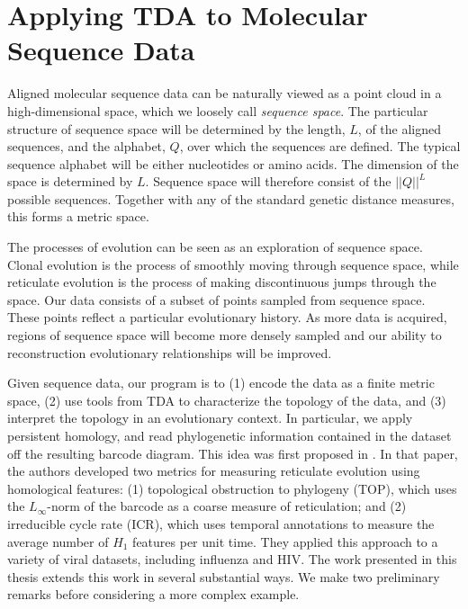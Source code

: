 \section{Applying TDA to Molecular Sequence Data}
\label{bg:top4bio}

Aligned molecular sequence data can be naturally viewed as a point cloud in a high-dimensional space, which we loosely call \emph{sequence space}.
The particular structure of sequence space will be determined by the length, $L$, of the aligned sequences, and the alphabet, $Q$, over which the sequences are defined.
The typical sequence alphabet will be either nucleotides or amino acids.
The dimension of the space is determined by $L$.
Sequence space will therefore consist of the $||Q||^L$ possible sequences.
Together with any of the standard genetic distance measures, this forms a metric space.

The processes of evolution can be seen as an exploration of sequence space.
Clonal evolution is the process of smoothly moving through sequence space, while reticulate evolution is the process of making discontinuous jumps through the space.
Our data consists of a subset of points sampled from sequence space.
These points reflect a particular evolutionary history.
As more data is acquired, regions of sequence space will become more densely sampled and our ability to reconstruction evolutionary relationships will be improved.

Given sequence data, our program is to (1) encode the data as a finite metric space, (2) use tools from TDA to characterize the topology of the data, and (3) interpret the topology in an evolutionary context.
In particular, we apply persistent homology, and read phylogenetic information contained in the dataset off the resulting barcode diagram.
This idea was first proposed in \cite{Chan:2013}.
In that paper, the authors developed two metrics for measuring reticulate evolution using homological features: (1) topological obstruction to phylogeny (TOP), which uses the $L_{\infty}$-norm of the barcode as a coarse measure of reticulation; and (2) irreducible cycle rate (ICR), which uses temporal annotations to measure the average number of $H_1$ features per unit time.
They applied this approach to a variety of viral datasets, including influenza and HIV.
The work presented in this thesis extends this work in several substantial ways.
We make two preliminary remarks before considering a more complex example.

